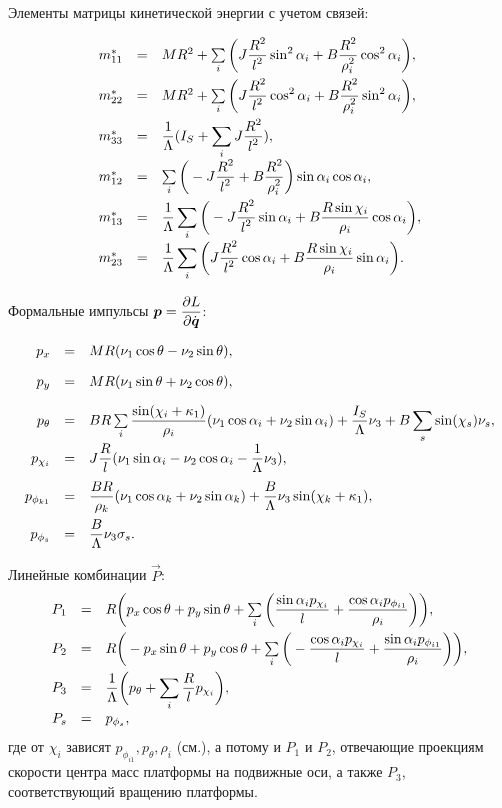 Элементы матрицы кинетической энергии с учетом связей:

\begin{equation}\label{mstar}
    \begin{array}{rcl}
        m^*_{11} & = & MR^2 + \sum\limits_i \bigg( J\ddfrac{R^2}{l^2}\sin^2\alpha_i + B\ddfrac{R^2}{\rho_i^2}\cos^2\alpha_i\bigg),\vsp
        m^*_{22} & = & MR^2 + \sum\limits_i \bigg(J\ddfrac{R^2}{l^2}\cos^2\alpha_i + B\ddfrac{R^2}{\rho_i^2}\sin^2\alpha_i\bigg),\vsp
        m^*_{33} & = & \ddfrac{1}{\Lambda}(I_S + \sum\limits_i J\ddfrac{R^2}{l^2}),\vsp
        m^*_{12} & = & \sum\limits_i \bigg(-J\ddfrac{R^2}{l^2} + B\ddfrac{R^2}{\rho_i^2}\bigg)\sin\alpha_i\cos\alpha_i,\vsp
        m^*_{13} & = & \ddfrac{1}{\Lambda}\sum\limits_i \bigg(-J\ddfrac{R^2}{l^2}\sin\alpha_i +  B\ddfrac{R\sin\chi_i}{\rho_i}\cos\alpha_i\bigg),\vsp
        m^*_{23} & = & \ddfrac{1}{\Lambda}\sum\limits_i \bigg(J\ddfrac{R^2}{l^2}\cos\alpha_i +  B\ddfrac{R\sin\chi_i}{\rho_i}\sin\alpha_i\bigg).\vsp
    \end{array}
\end{equation}

Формальные импульсы $\vec{p} = \ddpd{L}{\dot{\vec{q}}}$:

\begin{equation}\label{p}
    \begin{array}{rcl}
        p_x & = & MR(\nu_1\cos\theta-\nu_2\sin\theta),\vsp
        p_y & = & MR(\nu_1\sin\theta+\nu_2\cos\theta),\vsp
        p_\theta & = & BR\sum\limits_i\ddfrac{\sin(\chi_i + \kappa_1)}{\rho_i}(\nu_1\cos\alpha_i + \nu_2\sin\alpha_i) + \ddfrac{I_S}{\Lambda}\nu_3 + B\sum\limits_s\sin(\chi_s)\nu_s,\vsp
        p_{\chi_i} & = & J\ddfrac{R}{l}(\nu_1\sin\alpha_i - \nu_2\cos\alpha_i - \ddfrac{1}{\Lambda}\nu_3),\vsp
        p_{\phi_{k1}} & = & \ddfrac{BR}{\rho_k}(\nu_1\cos\alpha_k + \nu_2\sin\alpha_k) + \ddfrac{B}{\Lambda}\nu_3\sin(\chi_k+\kappa_1),\vsp
        p_{\phi_s} & = & \ddfrac{B}{\Lambda}\nu_3\sigma_s.
    \end{array}
\end{equation}

Линейные комбинации $\vec{P}$:
\begin{equation}\label{P}
    \begin{array}{rcl}
        P_1 & = & R\bigg(p_x\cos\theta + p_y\sin\theta + \sum\limits_{i}\bigg(\ddfrac{\sin\alpha_ip_{\chi_i}}{l} +  \ddfrac{\cos\alpha_ip_{\phi_{i1}}}{\rho_i}\bigg)\bigg),\vsp
        P_2 & = & R\bigg(-p_x\sin\theta + p_y\cos\theta + \sum\limits_{i}\bigg(-\ddfrac{\cos\alpha_ip_{\chi_i}}{l} +  \ddfrac{\sin\alpha_ip_{\phi_{i1}}}{\rho_i}\bigg)\bigg),\vsp
        P_3 & = & \ddfrac{1}{\Lambda}\bigg(p_\theta + \sum\limits_{i}\ddfrac{R}{l}p_{\chi_i}\bigg),\vsp
        P_s & = & p_{\phi_s},
    \end{array}
\end{equation}
где от $\chi_i$ зависят $p_{\phi_{i1}}, p_\theta, \rho_i$ (см.), а потому и $P_1$ и $P_2$, отвечающие проекциям скорости центра масс платформы на подвижные оси, а также $P_3$, соответствующий вращению платформы.

